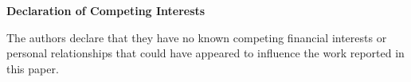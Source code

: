 \documentclass[11pt]{article}
\begin{document}
\begin{center}\textbf{Declaration of Competing Interests}\end{center}

The authors declare that they have no known competing financial interests or
personal relationships that could have appeared to influence the work reported
in this paper.
\end{document}
